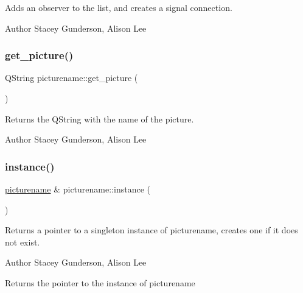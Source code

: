 Adds an observer to the list, and creates a signal connection. 

\begin{DoxyAuthor}{Author}
Stacey Gunderson, Alison Lee 
\end{DoxyAuthor}
\mbox{\label{classpicturename_a6b2c3caa683878aa5f95b9276502a8ae}} 
\subsubsection{\texorpdfstring{get\+\_\+picture()}{get\_picture()}}
{\footnotesize\ttfamily Q\+String picturename\+::get\+\_\+picture (\begin{DoxyParamCaption}{ }\end{DoxyParamCaption})}



Returns the Q\+String with the name of the picture. 

\begin{DoxyAuthor}{Author}
Stacey Gunderson, Alison Lee 
\end{DoxyAuthor}
\mbox{\label{classpicturename_a2447735d7a01afd95bceadcd5cfc28f2}} 
\subsubsection{\texorpdfstring{instance()}{instance()}}
{\footnotesize\ttfamily \mbox{\hyperlink{classpicturename}{picturename}} \& picturename\+::instance (\begin{DoxyParamCaption}{ }\end{DoxyParamCaption})\hspace{0.3cm}{\ttfamily [static]}}



Returns a pointer to a singleton instance of picturename, creates one if it does not exist. 

\begin{DoxyAuthor}{Author}
Stacey Gunderson, Alison Lee 
\end{DoxyAuthor}
\begin{DoxyReturn}{Returns}
the pointer to the instance of picturename 
\end{DoxyReturn}
\mbox{\label{classpicturename_ae4b0e336db224b42756d00dc2c8d67ba}} 
